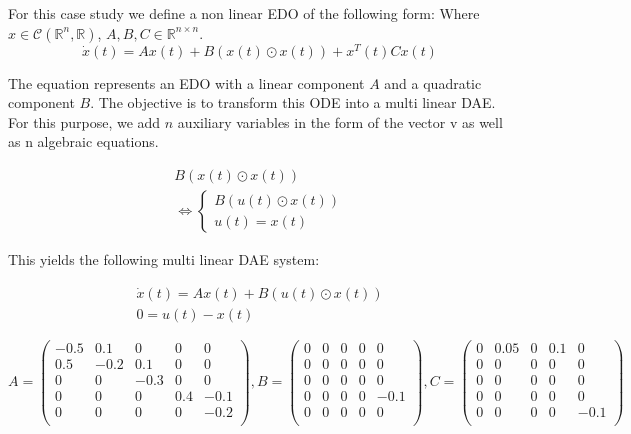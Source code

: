 \documentclass{article}
\begin{document}
For this case study we define a non linear EDO of the following form:
Where $x \in \mathcal{C}(\mathbb{R}^n, \mathbb{R})$, $A, B, C \in \mathbb{R}^{n \times n } $.
\begin{equation}
    \dot{x}(t) = Ax(t) + B(x(t) \odot x(t)) + x^T(t) C x(t)
\end{equation}

The equation represents an EDO with a linear component $A$ and a quadratic component $B$.
The objective is to transform this ODE into a multi linear DAE.
For this purpose, we add $n$ auxiliary variables in the form of the vector v as well as n algebraic equations.

\begin{align}
    B(x(t) \odot x(t)) \\
    \Leftrightarrow \left\{
        \begin{array}{ll}
            B(u(t) \odot x(t)) \\
            u(t) = x(t)
        \end{array}
    \right.
\end{align}

This yields the following multi linear DAE system:

\begin{align}
    \dot{x}(t) = Ax(t) + B(u(t) \odot x(t)) \\
    0 = u(t) - x(t)
\end{align}

\begin{equation}
    A =
    \begin{pmatrix}
        -0.5 & 0.1 & 0 & 0 & 0 \\
        0.5 & -0.2 & 0.1 & 0 & 0 \\
        0 & 0 & -0.3 & 0 & 0 \\
        0 & 0 & 0 & 0.4 & -0.1 \\
        0 & 0 & 0 & 0 & -0.2 \\
    \end{pmatrix},

    B = 
    \begin{pmatrix}
        0 & 0 & 0 & 0 & 0 \\
        0 & 0& 0 & 0 & 0 \\
        0 & 0 & 0 & 0 & 0 \\
        0 & 0 & 0 & 0 & -0.1 \\
        0 & 0 & 0 & 0 & 0 \\
    \end{pmatrix},

    C = 
    \begin{pmatrix}
        0 & 0.05 & 0 & 0.1 & 0 \\
        0 & 0& 0 & 0 & 0 \\
        0 & 0 & 0 & 0 & 0 \\
        0 & 0 & 0 & 0 & 0 \\
        0 & 0 & 0 & 0 & -0.1 \\
    \end{pmatrix}
\end{equation}
\end{document}

